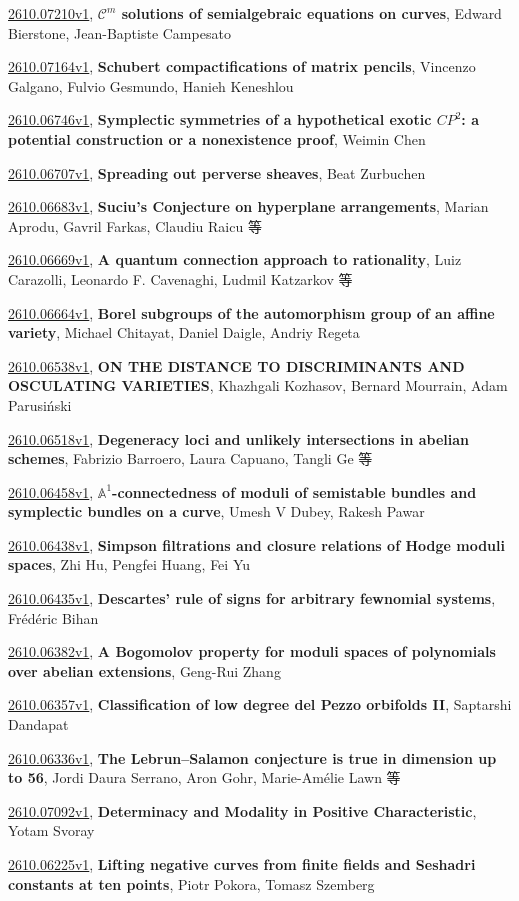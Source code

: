 \documentclass[9pt, a4paper]{article}
\theoremstyle{plain}
\theoremstyle{definition}
\theoremstyle{remark}
\newcommand{\arxiv}[3]{\href{https://arxiv.org/abs/#1}{#1}, \textbf{\textcolor{arxivblue}{#2}}, #3}
\begin{document}
\arxiv{2610.07210v1}{$\mathcal C^m$ solutions of semialgebraic equations on curves}{Edward Bierstone, Jean-Baptiste Campesato}

\arxiv{2610.07164v1}{Schubert compactifications of matrix pencils}{Vincenzo Galgano, Fulvio Gesmundo, Hanieh Keneshlou}

\arxiv{2610.06746v1}{Symplectic symmetries of a hypothetical exotic $CP^2$: a potential construction or a nonexistence proof}{Weimin Chen}

\arxiv{2610.06707v1}{Spreading out perverse sheaves}{Beat Zurbuchen}

\arxiv{2610.06683v1}{Suciu's Conjecture on hyperplane arrangements}{Marian Aprodu, Gavril Farkas, Claudiu Raicu 等}

\arxiv{2610.06669v1}{A quantum connection approach to rationality}{Luiz Carazolli, Leonardo F. Cavenaghi, Ludmil Katzarkov 等}

\arxiv{2610.06664v1}{Borel subgroups of the automorphism group of an affine variety}{Michael Chitayat, Daniel Daigle, Andriy Regeta}

\arxiv{2610.06538v1}{ON THE DISTANCE TO DISCRIMINANTS AND OSCULATING VARIETIES}{Khazhgali Kozhasov, Bernard Mourrain, Adam Parusi{ń}ski}

\arxiv{2610.06518v1}{Degeneracy loci and unlikely intersections in abelian schemes}{Fabrizio Barroero, Laura Capuano, Tangli Ge 等}

\arxiv{2610.06458v1}{$\mathbb{A}^1$-connectedness of moduli of semistable bundles and symplectic bundles on a curve}{Umesh V Dubey, Rakesh Pawar}

\arxiv{2610.06438v1}{Simpson filtrations and closure relations of Hodge moduli spaces}{Zhi Hu, Pengfei Huang, Fei Yu}

\arxiv{2610.06435v1}{Descartes' rule of signs for arbitrary fewnomial systems}{Frédéric Bihan}

\arxiv{2610.06382v1}{A Bogomolov property for moduli spaces of polynomials over abelian extensions}{Geng-Rui Zhang}

\arxiv{2610.06357v1}{Classification of low degree del Pezzo orbifolds II}{Saptarshi Dandapat}

\arxiv{2610.06336v1}{The Lebrun--Salamon conjecture is true in dimension up to 56}{Jordi Daura Serrano, Aron Gohr, Marie-Amélie Lawn 等}

\arxiv{2610.07092v1}{Determinacy and Modality in Positive Characteristic}{Yotam Svoray}

\arxiv{2610.06225v1}{Lifting negative curves from finite fields and Seshadri constants at ten points}{Piotr Pokora, Tomasz Szemberg}
\end{document}
